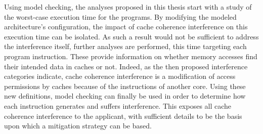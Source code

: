 Using model checking, the analyses proposed in this thesis start with a study
of the worst-case execution time for the programs. By modifying the modeled
architecture's configuration, the impact of cache coherence interference on
this execution time can be isolated. As such a result would not be sufficient
to address the interference itself, further analyses are performed, this time
targeting each program instruction. These provide information on whether
memory accesses find their intended data in caches or not. Indeed, as the then
proposed interference categories indicate, cache coherence interference is a
modification of access permissions by caches because of the instructions of
another core. Using these new definitions, model checking can finally be used
in order to determine how each instruction generates and suffers interference.
This exposes all cache coherence interference to the applicant, with sufficient
details to be the basis upon which a mitigation strategy can be based.


